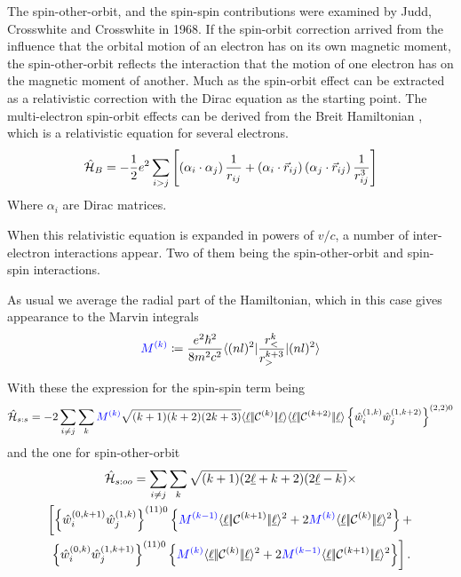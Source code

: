 \documentclass{article}
\begin{document}
The spin-other-orbit, and the spin-spin contributions were examined by Judd, Crosswhite and Crosswhite in 1968. If the spin-orbit correction arrived from the influence that the orbital motion of an electron has on its own magnetic moment, the spin-other-orbit reflects the interaction that the motion of one electron has on the magnetic moment of another. Much as the spin-orbit effect can be extracted as a relativistic correction with the Dirac equation as the starting point. The multi-electron spin-orbit effects can be derived from the Breit Hamiltonian \cite{bethe_quantum_1957}, which is a relativistic equation for several electrons.
\begin{equation}
\hat{\mathcal{H}}_B = -\frac{1}{2}e^2 \sum_{i>j} \left[ \left(\alpha_i\cdot\alpha_j\right)\frac{1}{r_{ij}} + \left(\alpha_i\cdot{\vec{r}_{ij}}\right)\left(\alpha_j\cdot\vec{r}_{ij}\right) \frac{1}{r_{ij}^3} \right]
\end{equation}
Where $\alpha_i$ are Dirac matrices.

When this relativistic equation is expanded in powers of $v/c$, a number of inter-electron interactions appear. Two of them being the spin-other-orbit and spin-spin interactions.

As usual we average the radial part of the Hamiltonian, which in this case gives appearance to the Marvin integrals
\begin{equation} 
\textcolor{blue}{M^{(k)}} \coloneqq \frac{e^2\hbar^2}{8m^2c^2} \langle (nl)^2|\frac{r_<^k}{r_>^{k+3}}|(nl)^2\rangle
\end{equation}

With these the expression for the spin-spin term being
\begin{multline}
\hat{\mathcal{H}}_{s:s} = -2 \sum_{i\neq{j}}
    \sum_k \textcolor{blue}{M^{(k)}}
        \sqrt{(k+1)(k+2)(2k+3)} 
        \langle \underbar{$\ell$}|\!|\mathcal{C}^{(k)}|\!|\underbar{$\ell$}\rangle 
        \langle \underbar{$\ell$}|\!|\mathcal{C}^{(k+2)}|\!|\underbar{$\ell$}\rangle
        \left\{
            \hat{w}_{i}^{({1},{k})}
            \hat{w}_{j}^{({1},{k+2})}
        \right\}^{(2,2)0}
\end{multline}
and the one for spin-other-orbit 
\begin{multline}
    \ham_{s:oo} = \sum_{i\neq{j}} 
        \sum_k 
            \sqrt{(k+1)(2\lorb+k+2)(2\lorb-k)}  \times \\ 
    \left[ \left\{ \wdouble{i}{0}{k+1} \wdouble{j}{1}{k} \right\}^{(11)0} 
    \left\{ \Mk{k-1}
        \redbraopket{\lorb}
            {\Ck{k+1}}
            {\lorb}^2
        +
        2 \Mk{k} \redbraopket{\lorb}{\Ck{k}}{\lorb}^2
    \right\} + \right. \\
    \left.
        \left\{ \wdouble{i}{0}{k}\wdouble{j}{1}{k+1} \right\}^{(11)0} 
            \left\{ \Mk{k} 
                \redbraopket{\lorb}{\Ck{k}}{\lorb}^2
                + 2 \Mk{k-1}
                \redbraopket{\lorb}{\Ck{k+1}}{\lorb}^2
            \right\}
    \right].
\end{multline}
\end{document}
